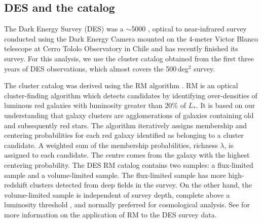 \subsection{DES and the {\rm \RM} catalog}\label{sec_DES}
The Dark Energy Survey (DES) was a $\sim$5000 \sqdeg, optical to near-infrared survey conducted using the Dark Energy Camera \citep{flaugher15} mounted on the 4-meter Victor Blanco telescope at Cerro Tololo Observatory in Chile and has recently finished its survey. 
For this analysis, we use the cluster catalog obtained from the first three years of DES observations, which almost covers the \sptpol{} 500\,deg$^{2}$ survey. 

The cluster catalog was derived using the RM algorithm \citep{rykoff14}.
RM is an optical cluster-finding algorithm which detects candidates by identifying over-densities of luminous red galaxies with luminosity greater than 20\% of $L_{*}.$
It is based on our understanding that galaxy clusters are agglomerations of galaxies containing old and subsequently red stars. 
The algorithm iteratively assigns membership and centering probabilities for each red galaxy identified as belonging to a cluster candidate. 
A weighted sum of the membership probabilities, richness $\lambda$, is assigned to each candidate.
The centre comes from the galaxy with the highest centering probability.
The DES RM catalog contains two samples: a flux-limited sample and a volume-limited sample. 
The flux-limited sample has more high-redshift clusters detected from deep fields in the survey. 
On the other hand, the volume-limited sample is independent of survey depth, complete above a luminosity threshold \citep[hereafter \cite{mcclintock18}]{mcclintock18}, and normally preferred for cosmological analysis.
See \citet{rykoff16} for more information on the application of RM to the DES survey data.

